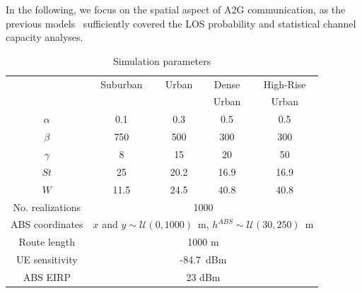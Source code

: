 \documentclass[10pt,conference]{IEEEtran}
\begin{document}
In the following, we focus on the spatial aspect of A2G communication, as the previous models~\cite{ITU,3GPPntn,Saboor2023simulator,Saboor2024model,Saboor2025pedestrian,Kim2023features,cho2025placement} sufficiently covered the LOS probability and statistical channel capacity analyses.

\begin{table}[!t]
\caption{Simulation parameters}\label{tab:setup}
\begin{center}
\begin{tabular}
{c|c|c|c|c}
&Suburban & Urban & Dense& High-Rise\\
&&&Urban&Urban \\ \hline
$\alpha$ & 0.1 & 0.3 & 0.5& 0.5 \\ 
$\beta$ & 750 & 500 & 300& 300 \\ 
$\gamma$ & 8 & 15 & 20& 50 \\ 
$St$ &25 & 20.2 & 16.9& 16.9 \\ 
$W$ &11.5 & 24.5 & 40.8& 40.8 \\ 
\hline
No. realizations & \multicolumn{4}{c}{1000}\\
ABS coordinates & \multicolumn{4}{c}{$x$ and $y \sim \mathcal{U}(0,1000)$~m, $h^{ABS} \sim \mathcal{U}(30,250)$~m}\\
Route length & \multicolumn{4}{c}{1000 m}\\
\hline
			UE sensitivity & \multicolumn{4}{c}{-84.7~dBm}\\
ABS EIRP & \multicolumn{4}{c}{23 dBm}\\
\end{tabular}
\label{tab1}
\end{center}

\end{table}
\end{document}
